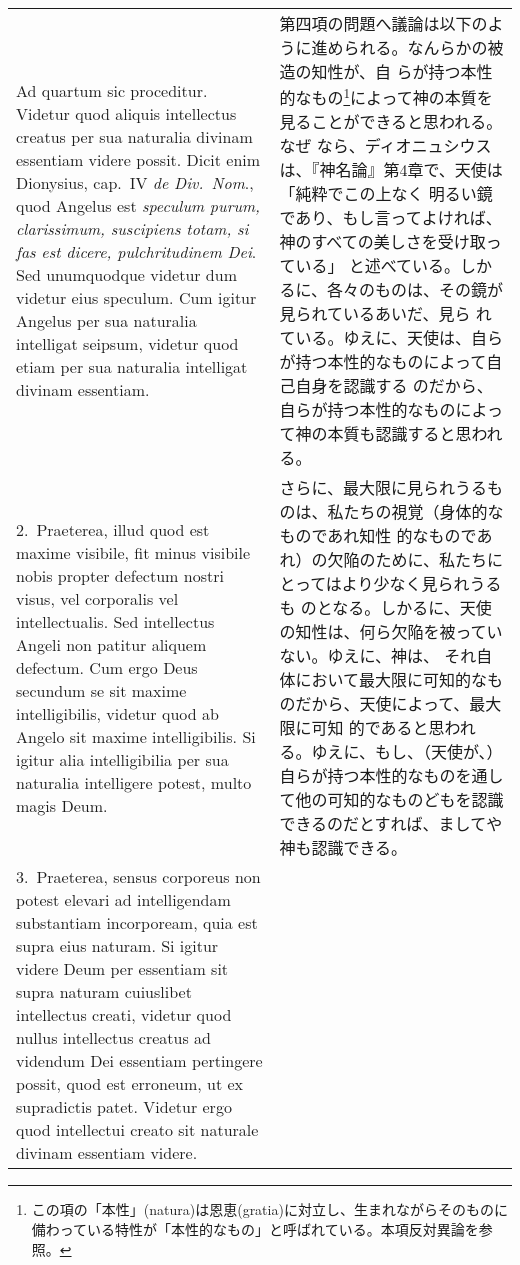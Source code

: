 \documentclass[10pt]{jsarticle} %
\begin{document}
\begin{longtable}{p{21em}p{21em}}

{\sc Ad quartum sic proceditur}. Videtur quod aliquis intellectus
creatus per sua naturalia divinam essentiam videre possit. Dicit enim
Dionysius, cap.\ IV {\it de Div.\ Nom}., quod Angelus est {\it
speculum purum, clarissimum, suscipiens totam, si fas est dicere,
pulchritudinem Dei}. Sed unumquodque videtur dum videtur eius
speculum. Cum igitur Angelus per sua naturalia intelligat seipsum,
videtur quod etiam per sua naturalia intelligat divinam essentiam.

&

第四項の問題へ議論は以下のように進められる。なんらかの被造の知性が、自
らが持つ本性的なもの\footnote{この項の「本性」(natura)は恩恵(gratia)に対立し、生まれながらそのものに備わっている特性が「本性的なもの」と呼ばれている。本項反対異論を参照。}によって神の本質を見ることができると思われる。なぜ
なら、ディオニュシウスは、『神名論』第4章で、天使は「純粋でこの上なく
明るい鏡であり、もし言ってよければ、神のすべての美しさを受け取っている」
と述べている。しかるに、各々のものは、その鏡が見られているあいだ、見ら
れている。ゆえに、天使は、自らが持つ本性的なものによって自己自身を認識する
のだから、自らが持つ本性的なものによって神の本質も認識すると思われる。

\\

2.~{\sc Praeterea}, illud quod est maxime visibile, fit minus visibile
nobis propter defectum nostri visus, vel corporalis vel
intellectualis. Sed intellectus Angeli non patitur aliquem
defectum. Cum ergo Deus secundum se sit maxime intelligibilis, videtur
quod ab Angelo sit maxime intelligibilis. Si igitur alia
intelligibilia per sua naturalia intelligere potest, multo magis Deum.


&

さらに、最大限に見られうるものは、私たちの視覚（身体的なものであれ知性
的なものであれ）の欠陥のために、私たちにとってはより少なく見られうるも
のとなる。しかるに、天使の知性は、何ら欠陥を被っていない。ゆえに、神は、
それ自体において最大限に可知的なものだから、天使によって、最大限に可知
的であると思われる。ゆえに、もし、（天使が、）自らが持つ本性的なものを通し
て他の可知的なものどもを認識できるのだとすれば、ましてや神も認識できる。

\\


3.~{\sc Praeterea}, sensus corporeus non potest elevari ad
intelligendam substantiam incorpoream, quia est supra eius naturam. Si
igitur videre Deum per essentiam sit supra naturam cuiuslibet
intellectus creati, videtur quod nullus intellectus creatus ad
videndum Dei essentiam pertingere possit, quod est erroneum, ut ex
supradictis patet. Videtur ergo quod intellectui creato sit naturale
divinam essentiam videre.


\end{longtable}
\end{document}
